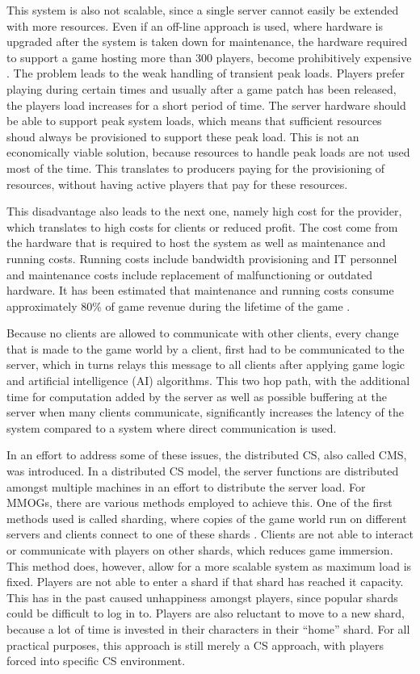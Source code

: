 \documentclass[journal,oneside,a4paper,onecolumn]{IEEEtran}
\begin{document}
This system is also not scalable, since a single server cannot easily be extended with more resources. Even if an off-line approach is used, where hardware is upgraded after the system is taken down for maintenance, the hardware required to support a game hosting more than 300 players, become prohibitively expensive \cite{}. The problem leads to the weak handling of transient peak loads. Players prefer playing during certain times and usually after a game patch has been released, the players load increases for a short period of time. The server hardware should be able to support peak system loads, which means that sufficient resources shoud always be provisioned to support these peak load. This is not an economically viable solution, because resources to handle peak loads are not used most of the time. This translates to producers paying for the provisioning of resources, without having active players that pay for these resources.

This disadvantage also leads to the next one, namely high cost for the provider, which translates to high costs for clients or reduced profit. The cost come from the hardware that is required to host the system as well as maintenance and running costs. Running costs include bandwidth provisioning and IT personnel and maintenance costs include replacement of malfunctioning or outdated hardware. It has been estimated that maintenance and running costs consume approximately 80\% of game revenue during the lifetime of the game \cite{}.

Because no clients are allowed to communicate with other clients, every change that is made to the game world by a client, first had to be communicated to the server, which in turns relays this message to all clients after applying game logic and artificial intelligence (AI) algorithms. This two hop path, with the additional time for computation added by the server as well as possible buffering at the server when many clients communicate, significantly increases the latency of the system compared to a system where direct communication is used.


In an effort to address some of these issues, the distributed \ac{CS}, also called \ac{CMS}, was introduced. In a distributed \ac{CS} model, the server functions are distributed amongst multiple machines in an effort to distribute the server load. For MMOGs, there are various methods employed to achieve this. One of the first methods used is called sharding, where copies of the game world run on different servers and clients connect to one of these shards \cite{}. Clients are not able to interact or communicate with players on other shards, which reduces game immersion. This method does, however, allow for a more scalable system as maximum load is fixed. Players are not able to enter a shard if that shard has reached it capacity. This has in the past caused unhappiness amongst players, since popular shards could be difficult to log in to. Players are also reluctant to move to a new shard, because a lot of time is invested in their characters in their ``home'' shard. For all practical purposes, this approach is still merely a \ac{CS} approach, with players forced into specific \ac{CS} environment.
\end{document}

